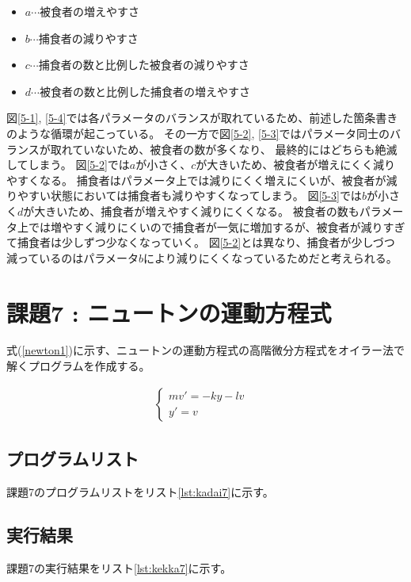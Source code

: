 \documentclass[a4j,titlepage]{jsarticle}
\begin{document}
\begin{itemize}
  \item $a$$\cdots$被食者の増えやすさ
  \item $b$$\cdots$捕食者の減りやすさ
  \item $c$$\cdots$捕食者の数と比例した被食者の減りやすさ
  \item $d$$\cdots$被食者の数と比例した捕食者の増えやすさ
\end{itemize}

図\ref{5-1}, \ref{5-4}では各パラメータのバランスが取れているため、前述した箇条書きのような循環が起こっている。
その一方で図\ref{5-2}, \ref{5-3}ではパラメータ同士のバランスが取れていないため、被食者の数が多くなり、
最終的にはどちらも絶滅してしまう。
図\ref{5-2}では$a$が小さく、$c$が大きいため、被食者が増えにくく減りやすくなる。
捕食者はパラメータ上では減りにくく増えにくいが、被食者が減りやすい状態においては捕食者も減りやすくなってしまう。
図\ref{5-3}では$b$が小さく$d$が大きいため、捕食者が増えやすく減りにくくなる。
被食者の数もパラメータ上では増やすく減りにくいので捕食者が一気に増加するが、被食者が減りすぎて捕食者は少しずつ少なくなっていく。
図\ref{5-2}とは異なり、捕食者が少しづつ減っているのはパラメータ$b$により減りにくくなっているためだと考えられる。


\section{課題7 : ニュートンの運動方程式}
式(\ref{newton1})に示す、ニュートンの運動方程式の高階微分方程式をオイラー法で解くプログラムを作成する。

\begin{eqnarray}
  \begin{cases}
mv'=-ky-lv&\\
y'= v&
 \label{newton1}
  \end{cases}\label{newton1}
\end{eqnarray}

\subsection{プログラムリスト}
課題7のプログラムリストをリスト\ref{lst:kadai7}に示す。



\subsection{実行結果}
課題7の実行結果をリスト\ref{lst:kekka7}に示す。
\end{document}
